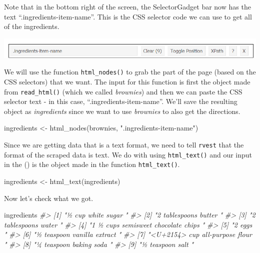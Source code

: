 \documentclass[
  12pt,
  openany]{book}
\newenvironment{Shaded}{\begin{snugshade}}{\end{snugshade}}
\newcommand{\CommentTok}[1]{\textcolor[rgb]{0.37,0.37,0.37}{\textit{#1}}}
\newcommand{\FunctionTok}[1]{\textcolor[rgb]{0,0,0}{#1}}
\newcommand{\NormalTok}[1]{#1}
\newcommand{\OtherTok}[1]{\textcolor[rgb]{0.37,0.37,0.37}{#1}}
\newcommand{\StringTok}[1]{\textcolor[rgb]{0.5,0.5,0.5}{#1}}
\begin{document}
Note that in the bottom right of the screen, the SelectorGadget bar now has the text ``.ingredients-item-name''. This is the CSS selector code we can use to get all of the ingredients.

\includegraphics{images/brownies_4.PNG}

We will use the function \texttt{html\_nodes()} to grab the part of the page (based on the CSS selectors) that we want. The input for this function is first the object made from \texttt{read\_html()} (which we called \emph{brownies}) and then we can paste the CSS selector text - in this case, ``.ingredients-item-name''. We'll save the resulting object as \emph{ingredients} since we want to use \emph{brownies} to also get the directions.

\begin{Shaded}
\begin{Highlighting}[]
\NormalTok{ingredients }\OtherTok{\textless{}{-}} \FunctionTok{html\_nodes}\NormalTok{(brownies, }\StringTok{".ingredients{-}item{-}name"}\NormalTok{)}
\end{Highlighting}
\end{Shaded}

Since we are getting data that is a text format, we need to tell \texttt{rvest} that the format of the scraped data is text. We do with using \texttt{html\_text()} and our input in the () is the object made in the function \texttt{html\_text()}.

\begin{Shaded}
\begin{Highlighting}[]
\NormalTok{ingredients }\OtherTok{\textless{}{-}} \FunctionTok{html\_text}\NormalTok{(ingredients)}
\end{Highlighting}
\end{Shaded}

Now let's check what we got.

\begin{Shaded}
\begin{Highlighting}[]
\NormalTok{ingredients}
\CommentTok{\#\textgreater{} [1] "½ cup white sugar "                 }
\CommentTok{\#\textgreater{} [2] "2 tablespoons butter "              }
\CommentTok{\#\textgreater{} [3] "2 tablespoons water "               }
\CommentTok{\#\textgreater{} [4] "1 ½ cups semisweet chocolate chips "}
\CommentTok{\#\textgreater{} [5] "2 eggs "                            }
\CommentTok{\#\textgreater{} [6] "½ teaspoon vanilla extract "        }
\CommentTok{\#\textgreater{} [7] "\textless{}U+2154\textgreater{} cup all{-}purpose flour "    }
\CommentTok{\#\textgreater{} [8] "¼ teaspoon baking soda "            }
\CommentTok{\#\textgreater{} [9] "½ teaspoon salt "}
\end{Highlighting}
\end{Shaded}
\end{document}
